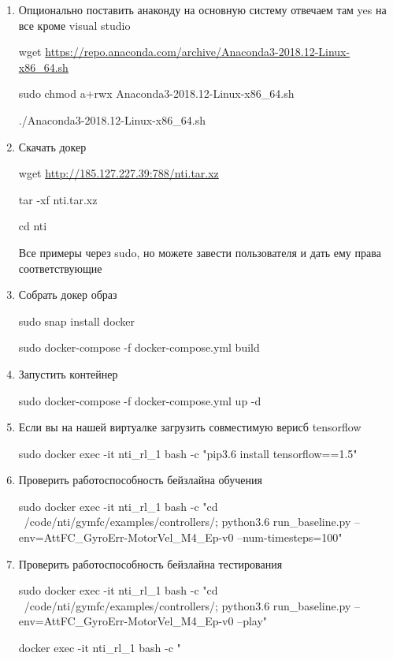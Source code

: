 \begin{enumerate}
    \item Опционально поставить анаконду на основную систему отвечаем там yes на все кроме visual studio
    
    wget \url{https://repo.anaconda.com/archive/Anaconda3-2018.12-Linux-x86_64.sh}
    
    sudo chmod a+rwx Anaconda3-2018.12-Linux-x86\_64.sh
    
    ./Anaconda3-2018.12-Linux-x86\_64.sh
    
    \item Скачать докер
    
    wget \url{http://185.127.227.39:788/nti.tar.xz}

    tar -xf nti.tar.xz

    cd nti

    Все примеры через sudo, но можете завести пользователя и дать ему права соответствующие

    \item Собрать докер образ
    
    sudo snap install docker

    sudo docker-compose  -f docker-compose.yml build

    \item Запустить контейнер

    sudo docker-compose -f docker-compose.yml up -d 

    \item Если вы на нашей виртуалке загрузить совместимую верисб tensorflow

    sudo docker exec -it nti\_rl\_1 bash -c "pip3.6 install tensorflow==1.5"
    
    \item Проверить работоспособность бейзлайна обучения

    sudo docker exec -it nti\_rl\_1 bash -c "cd ~/code/nti/gymfc/examples/controllers/; python3.6 run\_baseline.py --env=AttFC\_GyroErr-MotorVel\_M4\_Ep-v0 --num-timesteps=100"  

    \item Проверить работоспособность бейзлайна тестирования

    sudo docker exec -it nti\_rl\_1 bash -c "cd ~/code/nti/gymfc/examples/controllers/; python3.6 run\_baseline.py --env=AttFC\_GyroErr-MotorVel\_M4\_Ep-v0 --play"
    
    docker exec -it nti\_rl\_1 bash -c "
    
\end{enumerate}

